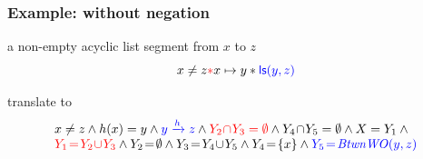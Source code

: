 \documentclass{beamer}
\begin{document}

\begin{frame}
  \frametitle{Example: without negation}
a non-empty acyclic list segment from $x$ to $z$
\[ x \neq z \textcolor{red}{*} x \mapsto y * \textcolor{blue}{\mathsf{ls}({y},{z})} \]

translate to
\[
\begin{array}{l}
x \neq z \land
\edge(x)=y \land
\textcolor{blue}{\reach{y}{z}} \land
\textcolor{red}{Y_2\!\cap\!Y_3 = \emptyset} \land
Y_4\!\cap\!Y_5 = \emptyset \land
X = Y_1 \land {} \\
\textcolor{red}{Y_1\!=\!Y_2\!\cup\!Y_3} \land
Y_2\!=\!\emptyset \land
Y_3\!=\!Y_4\!\cup\!Y_5 \land %
Y_4\!=\!\{x\} \land
\textcolor{blue}{Y_5\!=\!\BtwnWO(y,z)}
\end{array}
\]
\end{frame}
\end{document}
